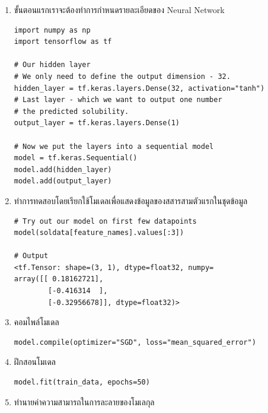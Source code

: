 \begin{enumerate}
    \item ขั้นตอนแรกเราจะต้องทำการกำหนดรายละเอียดของ Neural Network

          \begin{lstlisting}[style=MyPython]
import numpy as np
import tensorflow as tf

# Our hidden layer
# We only need to define the output dimension - 32.
hidden_layer = tf.keras.layers.Dense(32, activation="tanh")
# Last layer - which we want to output one number
# the predicted solubility.
output_layer = tf.keras.layers.Dense(1)

# Now we put the layers into a sequential model
model = tf.keras.Sequential()
model.add(hidden_layer)
model.add(output_layer)
\end{lstlisting}

          \vspace{1em}

    \item ทำการทดสอบโดยเรียกใช้โมเดลเพื่อแสดงข้อมูลของสสารสามตัวแรกในชุดข้อมูล

          \begin{lstlisting}[style=MyPython]
# Try out our model on first few datapoints
model(soldata[feature_names].values[:3])

# Output
<tf.Tensor: shape=(3, 1), dtype=float32, numpy=
array([[ 0.18162721],
        [-0.416314  ],
        [-0.32956678]], dtype=float32)>
\end{lstlisting}

          \vspace{1em}

    \item คอมไพล์โมเดล

          \begin{lstlisting}[style=MyPython]
model.compile(optimizer="SGD", loss="mean_squared_error")
\end{lstlisting}

          \vspace{1em}

    \item ฝึกสอนโมเดล

          \begin{lstlisting}[style=MyPython]
model.fit(train_data, epochs=50)
\end{lstlisting}

          \vspace{1em}

    \item ทำนายค่าความสามารถในการละลายของโมเลกุล


\end{enumerate}
